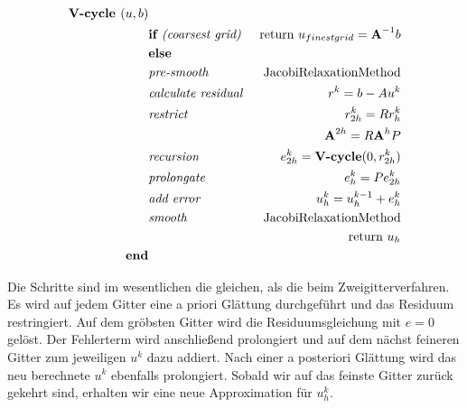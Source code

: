 \begin{eqnarray}
\textbf{V-cycle }(u,b)                         & \notag \\
&\textbf{if }\textit{(coarsest grid) }&\textnormal{return } u_{finest grid}={\textbf{A}}^{-1}b \notag \\
&\textbf{else }                                                & \notag \\
&\textit{pre-smooth }                                 &\textnormal{JacobiRelaxationMethod} \notag \\
&\textit{calculate residual }                &r^{k} = b - Au^{k} \notag \\
&\textit{restrict }                                 &r^{k}_{2h}=Rr^{k}_{h} \notag \\
&                                                                        &{\textbf{A}}^{2h} = R{\textbf{A}}^{h}P \notag \\
&\textit{recursion }                                &e^{k}_{2h} = \textbf{V-cycle}(0,r^{k}_{2h}) \notag \\
&\textit{prolongate }                                &e^{k}_{h} = Pe^{k}_{2h} \notag \\
&\textit{add error }                                &u^{k}_{h} = u^{k-1}_{h} + e^{k}_{h} \notag \\
&\textit{smooth }                                        &\textnormal{JacobiRelaxationMethod} \notag \\
&                                                                        &\textnormal{return } u_{h} \notag \\
\textbf{end}                                                & \notag
\end{eqnarray}

Die Schritte sind im wesentlichen die gleichen, als die beim Zweigitterverfahren. Es wird auf jedem Gitter eine a priori Glättung durchgeführt und das Residuum restringiert. Auf dem gröbsten Gitter wird die Residuumsgleichung mit $e = 0$ gelöst. Der Fehlerterm wird anschließend prolongiert und auf dem nächst feineren Gitter zum jeweiligen $u^{k}$ dazu addiert. Nach einer a posteriori Glättung wird das neu berechnete $u^{k}$ ebenfalls prolongiert. Sobald wir auf das feinste Gitter zurück gekehrt sind, erhalten wir eine neue Approximation für $u_{h}^{k}$.

 \label{V-Cycle}

